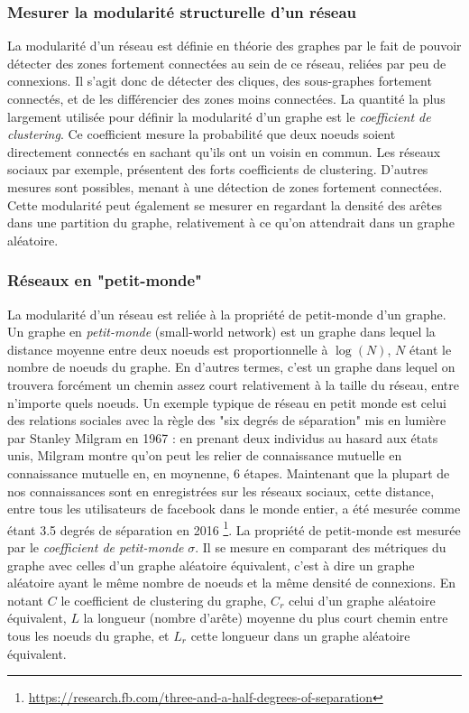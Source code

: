 \subsubsection{Mesurer la modularité structurelle d'un réseau}

La modularité d'un réseau est définie en théorie des graphes par le fait de pouvoir détecter des zones fortement connectées au sein de ce réseau, reliées par peu de connexions. Il s'agit donc de détecter des cliques, des sous-graphes fortement connectés, et de les différencier des zones moins connectées. 
La quantité la plus largement utilisée pour définir la	modularité d'un graphe est le \emph{coefficient de clustering}. Ce coefficient mesure la probabilité que deux noeuds soient directement connectés en sachant qu'ils ont un voisin en commun. Les réseaux sociaux par exemple, présentent des forts coefficients de clustering. D'autres mesures sont possibles, menant à une détection de zones fortement connectées. Cette modularité peut également se mesurer en regardant la densité des arêtes dans une partition du graphe, relativement à ce qu'on attendrait dans un graphe aléatoire. 


\subsubsection{Réseaux en "petit-monde"}

La modularité d'un réseau est reliée à la propriété de petit-monde d'un graphe. 
Un graphe en \emph{petit-monde} (small-world network) est un graphe dans lequel la distance moyenne entre deux noeuds est proportionnelle à $\log(N)$, $N$ étant le nombre de noeuds du graphe. En d'autres termes, c'est un graphe dans lequel on trouvera forcément un chemin assez court relativement à la taille du réseau, entre n'importe quels noeuds. Un exemple typique de réseau en petit monde est celui des relations sociales avec la règle des "six degrés de séparation" mis en lumière par Stanley Milgram en 1967 \cite{Milgram1967TheSW} : en prenant deux individus au hasard aux états unis, Milgram montre qu'on peut les relier de connaissance mutuelle en connaissance mutuelle en, en moynenne, 6 étapes. Maintenant que la plupart de nos connaissances sont en enregistrées sur les réseaux sociaux, cette distance, entre tous les utilisateurs de facebook dans le monde entier, a été mesurée comme étant 3.5 degrés de séparation en 2016 \footnote{\url{https://research.fb.com/three-and-a-half-degrees-of-separation}}. La propriété de petit-monde est mesurée par le \emph{coefficient de petit-monde} $\sigma$. Il se mesure en comparant des métriques du graphe avec celles d'un graphe aléatoire équivalent, c'est à dire un graphe aléatoire ayant le même nombre de noeuds et la même densité de connexions. 
En notant $C$ le coefficient de clustering du graphe, $C_r$ celui d'un graphe aléatoire équivalent, $L$ la longueur (nombre d'arête) moyenne du plus court chemin entre tous les noeuds du graphe, et $L_r$ cette longueur dans un graphe aléatoire équivalent. 

